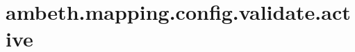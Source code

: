 \section{ambeth.mapping.config.validate.active}
\label{configuration:AmbethMappingConfigValidateActive}
\AvailableInJavaAndCsharp{\TODO}